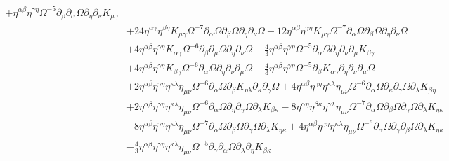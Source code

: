 \documentclass[10pt,letterpaper]{article}
\begin{document}
\begin{align}
 + \eta^{\alpha \beta} \eta^{\gamma \eta} \Omega^{-5} \partial_{\beta}\partial_{\alpha}\Omega \partial_{\eta}\partial_{\nu}K_{\mu \gamma}\nonumber\\
& + 24 \eta^{\alpha \gamma} \eta^{\beta \eta} K_{\mu \gamma} \Omega^{-7} \partial_{\alpha}\Omega \partial_{\beta}\Omega \partial_{\eta}\partial_{\nu}\Omega
 + 12 \eta^{\alpha \beta} \eta^{\gamma \eta} K_{\mu \gamma} \Omega^{-7} \partial_{\alpha}\Omega \partial_{\beta}\Omega \partial_{\eta}\partial_{\nu}\Omega\nonumber\\
& + 4 \eta^{\alpha \beta} \eta^{\gamma \eta} K_{\alpha \gamma} \Omega^{-6} \partial_{\beta}\partial_{\mu}\Omega \partial_{\eta}\partial_{\nu}\Omega
 -  \tfrac{4}{3} \eta^{\alpha \beta} \eta^{\gamma \eta} \Omega^{-5} \partial_{\alpha}\Omega \partial_{\eta}\partial_{\nu}\partial_{\mu}K_{\beta \gamma}\nonumber\\
& + 4 \eta^{\alpha \beta} \eta^{\gamma \eta} K_{\beta \gamma} \Omega^{-6} \partial_{\alpha}\Omega \partial_{\eta}\partial_{\nu}\partial_{\mu}\Omega
 -  \tfrac{4}{3} \eta^{\alpha \beta} \eta^{\gamma \eta} \Omega^{-5} \partial_{\beta}K_{\alpha \gamma} \partial_{\eta}\partial_{\nu}\partial_{\mu}\Omega\nonumber\\
& + 2 \eta^{\alpha \beta} \eta^{\gamma \eta} \eta^{\kappa \lambda} \eta_{\mu \nu} \Omega^{-6} \partial_{\alpha}\Omega \partial_{\beta}K_{\eta \lambda} \partial_{\kappa}\partial_{\gamma}\Omega
 + 4 \eta^{\alpha \beta} \eta^{\gamma \eta} \eta^{\kappa \lambda} \eta_{\mu \nu} \Omega^{-6} \partial_{\alpha}\Omega \partial_{\kappa}\partial_{\gamma}\Omega \partial_{\lambda}K_{\beta \eta}\nonumber\\
& + 2 \eta^{\alpha \beta} \eta^{\gamma \eta} \eta^{\kappa \lambda} \eta_{\mu \nu} \Omega^{-6} \partial_{\alpha}\Omega \partial_{\eta}\partial_{\gamma}\Omega \partial_{\lambda}K_{\beta \kappa}
 - 8 \eta^{\alpha \eta} \eta^{\beta \kappa} \eta^{\gamma \lambda} \eta_{\mu \nu} \Omega^{-7} \partial_{\alpha}\Omega \partial_{\beta}\Omega \partial_{\gamma}\Omega \partial_{\lambda}K_{\eta \kappa}\nonumber\\
& - 8 \eta^{\alpha \beta} \eta^{\gamma \eta} \eta^{\kappa \lambda} \eta_{\mu \nu} \Omega^{-7} \partial_{\alpha}\Omega \partial_{\beta}\Omega \partial_{\gamma}\Omega \partial_{\lambda}K_{\eta \kappa}
 + 4 \eta^{\alpha \beta} \eta^{\gamma \eta} \eta^{\kappa \lambda} \eta_{\mu \nu} \Omega^{-6} \partial_{\alpha}\Omega \partial_{\gamma}\partial_{\beta}\Omega \partial_{\lambda}K_{\eta \kappa}\nonumber\\
& -  \tfrac{4}{3} \eta^{\alpha \beta} \eta^{\gamma \eta} \eta^{\kappa \lambda} \eta_{\mu \nu} \Omega^{-5} \partial_{\gamma}\partial_{\alpha}\Omega \partial_{\lambda}\partial_{\eta}K_{\beta \kappa}

\end{align}
\end{document}
